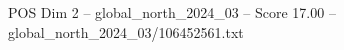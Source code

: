 \begin{textsample}{POS Dim 2 – global\_north\_2024\_03 – Score 17.00 – global\_north\_2024\_03/106452561.txt}
\end{textsample}
